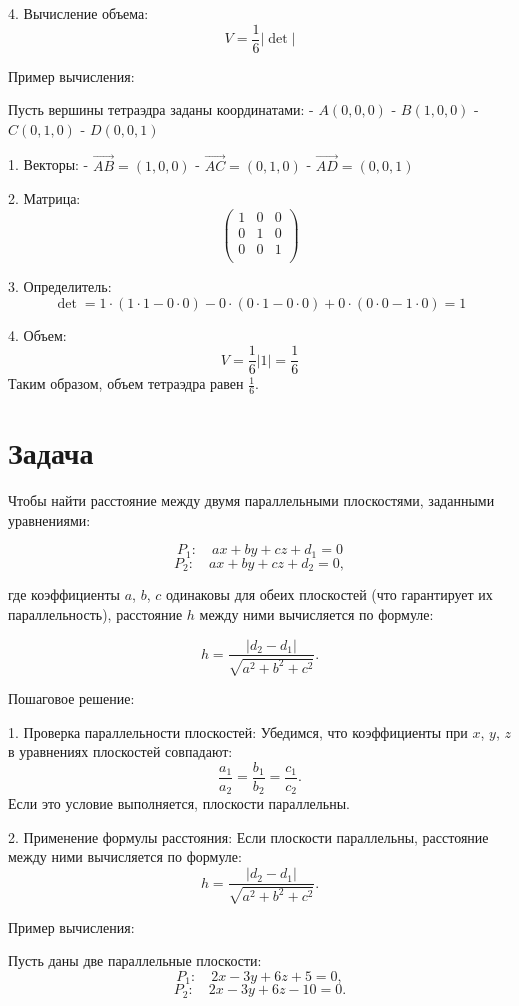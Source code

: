 \documentclass[a4paper,14pt]{extreport} %
\begin{document}
4.  Вычисление объема: 
   \[
   V = \frac{1}{6} \left| \det \right|
   \]

 Пример вычисления: 

Пусть вершины тетраэдра заданы координатами:
- \( A(0, 0, 0) \)
- \( B(1, 0, 0) \)
- \( C(0, 1, 0) \)
- \( D(0, 0, 1) \)

1.  Векторы: 
   - \( \vec{AB} = (1, 0, 0) \)
   - \( \vec{AC} = (0, 1, 0) \)
   - \( \vec{AD} = (0, 0, 1) \)

2.  Матрица: 
   \[
   \begin{pmatrix}
   1 & 0 & 0 \\
   0 & 1 & 0 \\
   0 & 0 & 1 \\
   \end{pmatrix}
   \]

3.  Определитель: 
   \[
   \det = 1 \cdot (1 \cdot 1 - 0 \cdot 0) - 0 \cdot (0 \cdot 1 - 0 \cdot 0) + 0 \cdot (0 \cdot 0 - 1 \cdot 0) = 1
   \]

4.  Объем: 
   \[
   V = \frac{1}{6} \left| 1 \right| = \frac{1}{6}
   \]
Таким образом, объем тетраэдра равен \( \frac{1}{6} \).
\section*{Задача}
Чтобы найти расстояние между двумя параллельными плоскостями, заданными уравнениями:

\[
P_1: \quad a x + b y + c z + d_1 = 0
\]
\[
P_2: \quad a x + b y + c z + d_2 = 0,
\]

где коэффициенты \( a \), \( b \), \( c \) одинаковы для обеих плоскостей (что гарантирует их параллельность), расстояние \( h \) между ними вычисляется по формуле:

\[
h = \frac{|d_2 - d_1|}{\sqrt{a^2 + b^2 + c^2}}.
\]

 Пошаговое решение: 

1.  Проверка параллельности плоскостей: 
   Убедимся, что коэффициенты при \( x \), \( y \), \( z \) в уравнениях плоскостей совпадают:
   \[
   \frac{a_1}{a_2} = \frac{b_1}{b_2} = \frac{c_1}{c_2}.
   \]
   Если это условие выполняется, плоскости параллельны.

2.  Применение формулы расстояния: 
   Если плоскости параллельны, расстояние между ними вычисляется по формуле:
   \[
   h = \frac{|d_2 - d_1|}{\sqrt{a^2 + b^2 + c^2}}.
   \]

 Пример вычисления: 

Пусть даны две параллельные плоскости:
\[
P_1: \quad 2x - 3y + 6z + 5 = 0,
\]
\[
P_2: \quad 2x - 3y + 6z - 10 = 0.
\]
\end{document}
